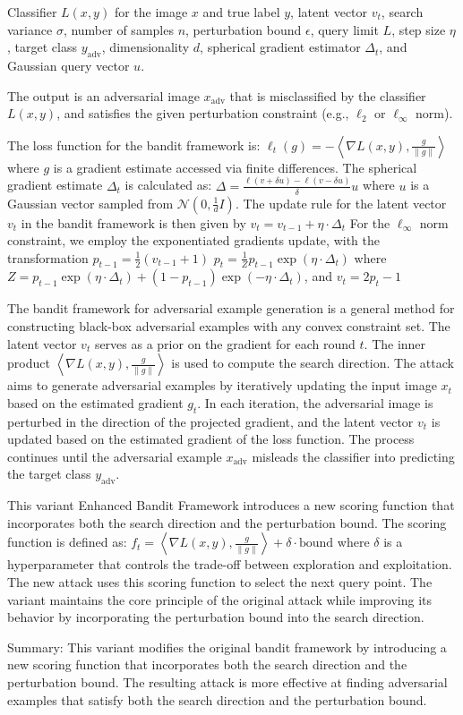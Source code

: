 Classifier $L(x, y)$ for the image $x$ and true label $y$, latent vector $v_t$, search variance $\sigma$, number of samples $n$, perturbation bound $\epsilon$, query limit $L$, step size $\eta$, target class $y_{\text{adv}}$, dimensionality $d$, spherical gradient estimator $\Delta_t$, and Gaussian query vector $u$.

The output is an adversarial image $x_{\text{adv}}$ that is misclassified by the classifier $L(x, y)$, and satisfies the given perturbation constraint (e.g., $\ell_2$ or $\ell_\infty$ norm).

The loss function for the bandit framework is:
$\ell_t(g) = -\left\langle \nabla L(x, y), \frac{g}{\|g\|} \right\rangle$
where $g$ is a gradient estimate accessed via finite differences. The spherical gradient estimate $\Delta_t$ is calculated as:
$\Delta = \frac{\ell(v + \delta u) - \ell(v - \delta u)}{\delta} u$
where $u$ is a Gaussian vector sampled from $\mathcal{N}(0, \frac{1}{d} I)$. The update rule for the latent vector $v_t$ in the bandit framework is then given by $v_t = v_{t-1} + \eta \cdot \Delta_t$
For the $\ell_\infty$ norm constraint, we employ the exponentiated gradients update, with the transformation $p_{t-1} = \frac{1}{2} (v_{t-1} + 1)$
$p_t = \frac{1}{Z} p_{t-1} \exp(\eta \cdot \Delta_t)$
where $Z = p_{t-1} \exp(\eta \cdot \Delta_t) + (1 - p_{t-1}) \exp(-\eta \cdot \Delta_t)$, and $v_t = 2p_t - 1$

The bandit framework for adversarial example generation is a general method for constructing black-box adversarial examples with any convex constraint set. The latent vector $v_t$ serves as a prior on the gradient for each round $t$. The inner product $\left\langle \nabla L(x, y), \frac{g}{\|g\|} \right\rangle$ is used to compute the search direction.
The attack aims to generate adversarial examples by iteratively updating the input image $x_t$ based on the estimated gradient $g_t$. In each iteration, the adversarial image is perturbed in the direction of the projected gradient, and the latent vector $v_t$ is updated based on the estimated gradient of the loss function. The process continues until the adversarial example $x_{\text{adv}}$ misleads the classifier into predicting the target class $y_{\text{adv}}$.

This variant Enhanced Bandit Framework introduces a new scoring function that incorporates both the search direction and the perturbation bound. The scoring function is defined as:
$f_t = \left\langle \nabla L(x, y), \frac{g}{\|g\|} \right\rangle + \delta \cdot \text{bound}$
where $\delta$ is a hyperparameter that controls the trade-off between exploration and exploitation.
The new attack uses this scoring function to select the next query point. The variant maintains the core principle of the original attack while improving its behavior by incorporating the perturbation bound into the search direction.

Summary: This variant modifies the original bandit framework by introducing a new scoring function that incorporates both the search direction and the perturbation bound. The resulting attack is more effective at finding adversarial examples that satisfy both the search direction and the perturbation bound.